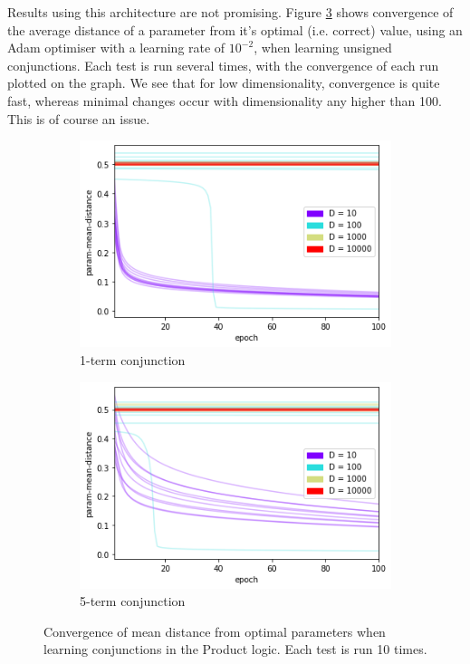 Results using this architecture are not promising.  Figure \ref{fig:conjconvnokeepn} shows convergence of the average distance of a parameter from it's optimal (i.e. correct) value, using an Adam optimiser with a learning rate of $10^{-2}$, when learning unsigned conjunctions. Each test is run several times, with the convergence of each run plotted on the graph. We see that for low dimensionality, convergence is quite fast, whereas minimal changes occur with dimensionality any higher than 100. This is of course an issue.

\begin{figure}[h]
    \centering
    \begin{subfigure}[b]{0.48\textwidth}
        \centering
        \includegraphics[width=\textwidth]{imgs/conj-pmd-prod-nokeepn-1t.png}
        \caption{1-term conjunction}
        \label{fig:conjconvnokeepn1}
    \end{subfigure}
    \begin{subfigure}[b]{0.48\textwidth}
        \centering
        \includegraphics[width=\textwidth]{imgs/conj-pmd-prod-nokeepn-5t.png}
        \caption{5-term conjunction}
        \label{fig:conjconvnokeepn5}
    \end{subfigure}
       \caption{Convergence of mean distance from optimal parameters when learning conjunctions in the Product logic. Each test is run 10 times.}
       \label{fig:conjconvnokeepn}
\end{figure}

